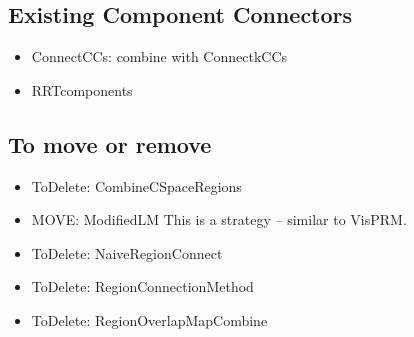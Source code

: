 
\subsection{Existing Component Connectors}
\begin{itemize}
\item ConnectCCs: combine with ConnectkCCs
\item RRTcomponents
\end{itemize}


\subsection{To move or remove}
\begin{itemize}
\item ToDelete: CombineCSpaceRegions
\item MOVE: ModifiedLM This is a strategy -- similar to VisPRM.
\item ToDelete: NaiveRegionConnect
\item ToDelete: RegionConnectionMethod
\item ToDelete: RegionOverlapMapCombine
\end{itemize}